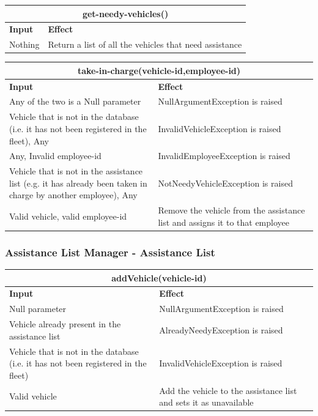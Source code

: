 \documentclass{article}
\begin{document}
\newline
\begin{tabular}{ |p{5cm}|p{7cm}| }
  \hline
  \multicolumn{2}{|c|}{get-needy-vehicles()} \\
  \hline
  \textbf{Input} & \textbf{Effect} \\
  \hline
  Nothing & Return a list of all the vehicles that need assistance\\
  \hline
\end{tabular}
\begin{tabular}{ |p{5cm}|p{7cm}| }
  \hline
  \multicolumn{2}{|c|}{take-in-charge(vehicle-id,employee-id)} \\
  \hline
  \textbf{Input} & \textbf{Effect} \\
  \hline
  Any of the two is a Null parameter & NullArgumentException is raised\\
  \hline
 Vehicle that is not in the database (i.e. it has not been registered in the fleet), Any & InvalidVehicleException is raised\\
  \hline
  Any, Invalid employee-id & InvalidEmployeeException is raised\\
  \hline
  Vehicle that is not in the assistance list (e.g. it has already been taken in charge by another employee), Any & NotNeedyVehicleException is raised\\
  \hline
  Valid vehicle, valid employee-id & Remove the vehicle from the assistance list and assigns it to that employee\\
  \hline
\end{tabular}
\subsubsection{Assistance List Manager - Assistance List}
\begin{tabular}{ |p{5cm}|p{7cm}| }
  \hline
  \multicolumn{2}{|c|}{addVehicle(vehicle-id)} \\
  \hline
  \textbf{Input} & \textbf{Effect} \\
  \hline
  Null parameter & NullArgumentException is raised\\
  \hline
  Vehicle already present in the assistance list & AlreadyNeedyException is raised\\
  \hline
  Vehicle that is not in the database (i.e. it has not been registered in the fleet) & InvalidVehicleException is raised\\
  \hline
  Valid vehicle & Add the vehicle to the assistance list and sets it as unavailable\\
  \hline
\end{tabular}
\end{document}
